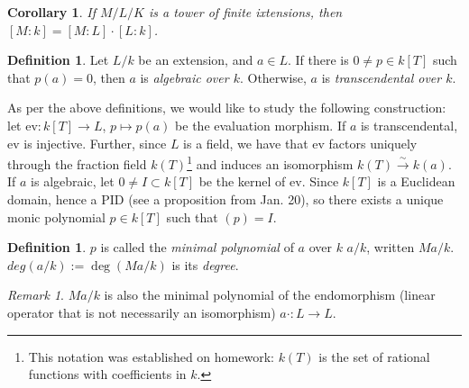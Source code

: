 \documentclass{amsart}
\newtheorem{cor}{Corollary}
\theoremstyle{definition}
\newtheorem{defn}[thm]{Definition}
\theoremstyle{remark}
\newtheorem*{rmk}{Remark}
\begin{document}
\begin{cor}
If $M/L/K$ is a tower of finite ixtensions, then $[M : k] = [M : L] \cdot [L : k]$.
\end{cor}

\begin{defn}
Let $L/k$ be an extension, and $a \in L$. If there is $0 \neq p \in k[T]$ such that $p(a) = 0$, then $a$ is \textit{algebraic over $k$}. Otherwise, $a$ is \textit{transcendental over $k$}.
\end{defn}

As per the above definitions, we would like to study the following construction: let $\text{ev} \colon k[T] \rightarrow L$, $p \mapsto p(a)$ be the evaluation morphism. If $a$ is transcendental, ev is injective. Further, since $L$ is a field, we have that ev factors uniquely through the fraction field $k(T)$\footnote{This notation was established on homework: $k(T)$ is the set of rational functions with coefficients in $k$.} and induces an isomorphism $k(T) \stackrel{\sim}{\rightarrow} k(a)$. If $a$ is algebraic, let $0 \neq I \subset k[T]$ be the kernel of ev. Since $k[T]$ is a Euclidean domain, hence a PID (see a proposition from Jan. 20), so there exists a unique monic polynomial $p \in k[T]$ such that $(p) = I$.

\begin{defn}
$p$ is called the \textit{minimal polynomial} of $a$ over $k$ $a/k$, written $Ma/k$. $deg(a/k) := \deg(Ma/k)$ is its \textit{degree}.
\end{defn}

\begin{rmk}
$Ma/k$ is also the minimal polynomial of the endomorphism (linear operator that is not necessarily an isomorphism) $a \cdot \colon L \rightarrow L$.
\end{rmk}
\end{document}
